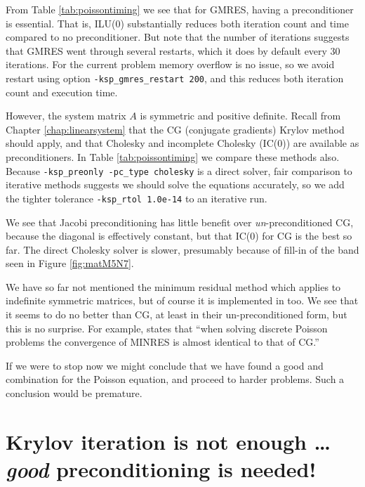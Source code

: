 From Table \ref{tab:poissontiming} we see that for GMRES, having a preconditioner is essential.  That is, ILU($0$) substantially reduces both iteration count and time compared to no preconditioner.  But note that the number of iterations suggests that GMRES went through several restarts, which it does by default every 30 iterations.  For the current problem memory overflow is no issue, so we avoid restart using option \texttt{-ksp\_gmres\_restart 200}, and this reduces both iteration count and execution time.

However, the system matrix $A$ is symmetric and positive definite.  Recall from Chapter \ref{chap:linearsystem} that the CG (conjugate gradients) Krylov method should apply, and that Cholesky and incomplete Cholesky (IC($0$)) are available as preconditioners.  In Table \ref{tab:poissontiming} we compare these methods also.  Because \texttt{-ksp\_preonly -pc\_type cholesky} is a direct solver, fair comparison to iterative methods suggests we should solve the equations accurately, so we add the tighter tolerance \texttt{-ksp\_rtol 1.0e-14} to an iterative run.

We see that Jacobi preconditioning has little benefit over \emph{un}-preconditioned CG, because the diagonal is effectively constant, but that IC($0$) for CG is the best so far.  The direct Cholesky solver is slower, presumably because of fill-in of the band seen in Figure \ref{fig:matM5N7}.

We have so far not mentioned the minimum residual method \citep[MINRES]{Greenbaum1997} which applies to indefinite symmetric matrices, but of course it is implemented in \PETSc too.  We see that it seems to do no better than CG, at least in their un-preconditioned form, but this is no surprise.  For example, \citet[][p.~88]{Elmanetal2005} states that ``when solving discrete Poisson problems the convergence of MINRES is almost identical to that of CG.''

If we were to stop now we might conclude that we have found a good \pKSP and \pPC combination for the Poisson equation, and proceed to harder problems.  Such a conclusion would be premature.


\section{Krylov iteration is not enough \dots \emph{good} preconditioning is needed!}

